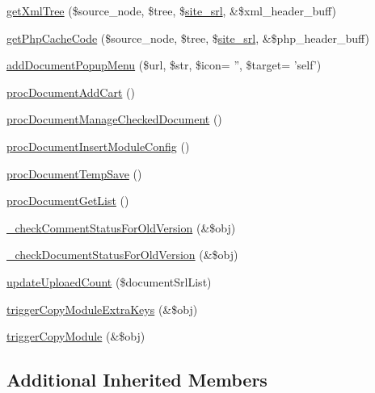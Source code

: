 \begin{DoxyCompactItemize}
\item 
\hyperlink{classdocumentController_ad18d5e7c2cfbef82020548e13e00df7d}{get\+Xml\+Tree} (\$source\+\_\+node, \$tree, \$\hyperlink{ko_8install_8php_a8b1406b4ad1048041558dce6bfe89004}{site\+\_\+srl}, \&\$xml\+\_\+header\+\_\+buff)
\item 
\hyperlink{classdocumentController_a0e0c1eb0506e936703b6b2b4ed958e5f}{get\+Php\+Cache\+Code} (\$source\+\_\+node, \$tree, \$\hyperlink{ko_8install_8php_a8b1406b4ad1048041558dce6bfe89004}{site\+\_\+srl}, \&\$php\+\_\+header\+\_\+buff)
\item 
\hyperlink{classdocumentController_a763e7cfbb01e26e7b0adaf0d25ff9373}{add\+Document\+Popup\+Menu} (\$url, \$str, \$icon= '', \$target= 'self')
\item 
\hyperlink{classdocumentController_a9072167f6533f269be32a0a43e147dae}{proc\+Document\+Add\+Cart} ()
\item 
\hyperlink{classdocumentController_a96dee41cd75a387fee93375d33633aba}{proc\+Document\+Manage\+Checked\+Document} ()
\item 
\hyperlink{classdocumentController_aede408d35ea6622dfa1b39ec52f84e44}{proc\+Document\+Insert\+Module\+Config} ()
\item 
\hyperlink{classdocumentController_a65e4d6ef48c59e92bf82e8ced4b85d4d}{proc\+Document\+Temp\+Save} ()
\item 
\hyperlink{classdocumentController_a23cf92fe7c204813d12c5996360cd939}{proc\+Document\+Get\+List} ()
\item 
\hyperlink{classdocumentController_a3fad5f9653c0ca05bcb1a63a24c318cf}{\+\_\+check\+Comment\+Status\+For\+Old\+Version} (\&\$obj)
\item 
\hyperlink{classdocumentController_ad0d7bdcafe22b9f7ee8f5ae072f3f146}{\+\_\+check\+Document\+Status\+For\+Old\+Version} (\&\$obj)
\item 
\hyperlink{classdocumentController_a2e3e591a2262e0fffc195456248b89ff}{update\+Uploaed\+Count} (\$document\+Srl\+List)
\item 
\hyperlink{classdocumentController_a5e03be29c7b61f87658b604ba80daa88}{trigger\+Copy\+Module\+Extra\+Keys} (\&\$obj)
\item 
\hyperlink{classdocumentController_a612ee2c47ff03e76f6e86fa31ff098a7}{trigger\+Copy\+Module} (\&\$obj)
\end{DoxyCompactItemize}
\subsection*{Additional Inherited Members}


